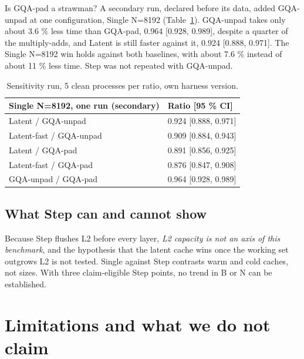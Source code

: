 \documentclass[conference]{IEEEtran}
\begin{document}
Is GQA-pad a strawman? A secondary run, declared before its data, added GQA-unpad at one configuration, Single N=8192 (Table~\ref{tab:7}). GQA-unpad takes only about 3.6 \% less time than GQA-pad, 0.964 {[}0.928, 0.989{]}, despite a quarter of the multiply-adds, and Latent is still faster against it, 0.924 {[}0.888, 0.971{]}. The Single N=8192 win holds against both baselines, with about 7.6 \% instead of about 11 \% less time. Step was not repeated with GQA-unpad.

\begin{table}[t]
\centering
\caption{Sensitivity run, 5 clean processes per ratio, own harness version.}\label{tab:7}
\begin{tabular}{ll}
\toprule
Single N=8192, one run (secondary) & Ratio {[}95 \% CI{]} \\
\midrule
Latent / GQA-unpad & 0.924 {[}0.888, 0.971{]} \\
Latent-fast / GQA-unpad & 0.909 {[}0.884, 0.943{]} \\
Latent / GQA-pad & 0.891 {[}0.856, 0.925{]} \\
Latent-fast / GQA-pad & 0.876 {[}0.847, 0.908{]} \\
GQA-unpad / GQA-pad & 0.964 {[}0.928, 0.989{]} \\
\bottomrule
\end{tabular}
\end{table}

\subsection{What Step can and cannot show}

Because Step flushes L2 before every layer, \emph{L2 capacity is not an axis of this benchmark}, and the hypothesis that the latent cache wins once the working set outgrows L2 is not tested. Single against Step contrasts warm and cold caches, not sizes. With three claim-eligible Step points, no trend in B or N can be established.

\section{Limitations and what we do not claim}\label{sec:7}
\end{document}
